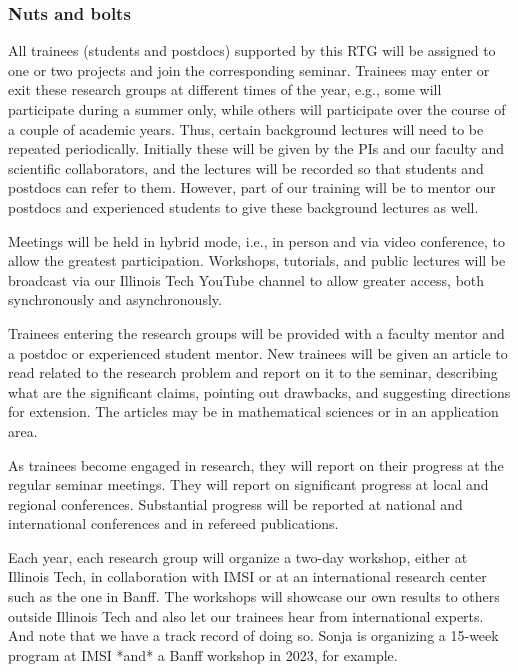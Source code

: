 \documentclass[11pt]{NSFamsart}
\begin{document}
\subsubsection*{Nuts and bolts} 
All trainees (students and postdocs) supported by this RTG will be assigned to one or two projects and join the corresponding seminar. 
Trainees may enter or exit these research groups at different times of the year, e.g., some will participate during a summer only, while others will participate over the course of a couple of academic years. Thus, certain background lectures will need to be repeated periodically.  Initially these will be given by the PIs and our faculty and scientific collaborators, and the lectures will be recorded so that students and postdocs can refer to them.  However, part of our training will be to mentor our postdocs and experienced students to give these background lectures as well.  

Meetings will be held in hybrid mode, i.e., in person and via video conference, to allow the greatest participation.  Workshops, tutorials, and public lectures will be broadcast via our Illinois Tech YouTube channel to allow greater access, both synchronously and asynchronously.

Trainees entering the research groups will be provided with a faculty mentor and a postdoc or experienced student mentor.  New trainees will be given an article to read related to the research problem and report on it to the seminar, describing what are the significant claims, pointing out drawbacks, and suggesting directions for extension. The articles may be in mathematical sciences or in an application area.

As trainees become engaged in research, they will report on their progress at the regular seminar meetings. They will report on significant progress at local and regional conferences.  Substantial progress will be reported at national and international conferences and in refereed publications.

Each year, each research group will organize a two-day workshop, either at Illinois Tech, in collaboration with IMSI or at an international research center such as the one in Banff.  The workshops will showcase our own results to others outside Illinois Tech and also let our trainees hear from international experts.
{\color{magenta} And note that we have a track record of doing so. Sonja is organizing a 15-week program at IMSI *and* a Banff workshop in 2023, for example.}
\end{document}
